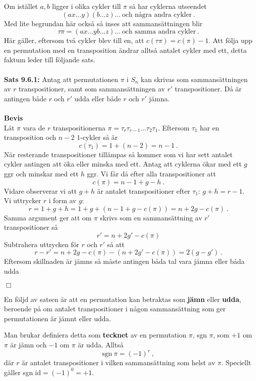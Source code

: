 \documentclass{article}
\begin{document}
Om istället $a,b$ ligger i olika cykler till $\pi$ så har cyklerna utseendet
$$
(ax...y)(b...z)... \ \textrm{och några andra cykler} \ .
$$
Med lite begrundan här också så inses att sammansättningen blir
$$
\tau\pi=(ax...yb...z)... \ \textrm{och samma andra cykler} \ .
$$
Här gäller, eftersom två cykler blev till en, att $c(\tau\pi)=c(\pi)-1$. Att följa upp en permutation med en transposition ändrar alltså antalet cykler med ett, detta faktum leder till följande sats.
\\ \\
\textbf{Sats 9.6.1:} Antag att permutationen $\pi$ i $S_n$ kan skrivas som sammansättningen av $r$ transpositioner, samt som sammansättningen av $r'$ transpositioner. Då är antingen både $r$ och $r'$ udda eller både $r$ och $r'$ jämna.
\\ \\
\textbf{Bevis}
\\
Låt $\pi$ vara de $r$ transpositionerna $\pi=\tau_r\tau_{r-1}...\tau_2\tau_1$. Eftersom $\tau_1$ har en transposition och $n-2$ $1$-cykler så är
$$
c(\tau_1)=1+(n-2)=n-1 \ .
$$
När resterande transpositioner tillämpas så kommer som vi har sett antalet cykler antingen att öka eller minska med ett. Antag att cyklerna ökar med ett $g$ ggr och minskar med ett $h$ ggr. Vi får då efter alla transpositioner att
$$
c(\pi)=n-1+g-h \ .
$$
Vidare observerar vi att $g+h$ är antalet transpositioner efter $\tau_1$: $g+h=r-1$. Vi uttrycker $r$ i form av $g$:
$$
r=1+g+h=1+g+(n-1+g-c(\pi))=n+2g-c(\pi) \ .
$$
Samma argument ger att om $\pi$ skrivs som en sammansättning av $r'$ transpositioner så
$$
r'=n+2g'-c(\pi)
$$
Subtrahera uttrycken för $r$ och $r'$ så att
$$
r-r'=n+2g-c(\pi)-(n+2g'-c(\pi))=2(g-g') \ .
$$
Eftersom skillnaden är jämns så måste antingen båda tal vara jämna eller båda udda
\begin{flushright}
$\Box$
\end{flushright}
En följd av satsen är att en permutation kan betraktas som \textbf{jämn} eller \textbf{udda}, beroende på om antalet transpositioner i någon sammansättning som ger permutationen är jämnt eller udda.

Man brukar definiera detta som \textbf{tecknet} av en permutation $\pi$, sgn $\pi$, som $+1$ om $\pi$ är jämn och $-1$ om $\pi$ är udda. Alltså
$$
\textrm{sgn} \ \pi=(-1)^r \ ,
$$
där $r$ är antalet transpositioner i vilken sammansättning som helst av $\pi$. Speciellt gäller sgn id$=(-1)^0=+1$.
\end{document}
